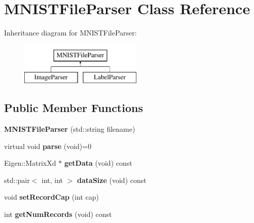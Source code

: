 \hypertarget{class_m_n_i_s_t_file_parser}{}\section{M\+N\+I\+S\+T\+File\+Parser Class Reference}
\label{class_m_n_i_s_t_file_parser}
Inheritance diagram for M\+N\+I\+S\+T\+File\+Parser\+:\begin{figure}[H]
\begin{center}
\leavevmode
\includegraphics[height=2.000000cm]{class_m_n_i_s_t_file_parser}
\end{center}
\end{figure}
\subsection*{Public Member Functions}
\begin{DoxyCompactItemize}
\item 
\mbox{\label{class_m_n_i_s_t_file_parser_a4e50774bc3ff914f91742020ebddd842}} 
{\bfseries M\+N\+I\+S\+T\+File\+Parser} (std\+::string filename)
\item 
\mbox{\label{class_m_n_i_s_t_file_parser_a77153a0159347e41761c0948b34a8893}} 
virtual void {\bfseries parse} (void)=0
\item 
\mbox{\label{class_m_n_i_s_t_file_parser_a91934edbf3852030ef9341281491637e}} 
Eigen\+::\+Matrix\+Xd $\ast$ {\bfseries get\+Data} (void) const
\item 
\mbox{\label{class_m_n_i_s_t_file_parser_afd1183b4334e41d9e5060e70c07b5759}} 
std\+::pair$<$ int, int $>$ {\bfseries data\+Size} (void) const
\item 
\mbox{\label{class_m_n_i_s_t_file_parser_a2cc71c0f1ada30d6039f1f90d864696d}} 
void {\bfseries set\+Record\+Cap} (int cap)
\item 
\mbox{\label{class_m_n_i_s_t_file_parser_ab01a79cb739cb2e90226240365e11f30}} 
int {\bfseries get\+Num\+Records} (void) const
\end{DoxyCompactItemize}
